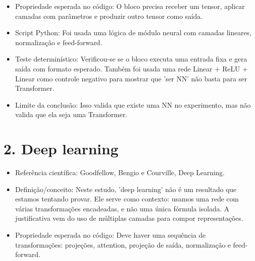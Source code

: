 \begin{itemize}
\item Propriedade esperada no código:
O bloco precisa receber um tensor, aplicar camadas com parâmetros e produzir
outro tensor como saída.
\end{itemize}

\begin{itemize}
\item Script Python:
Foi usada uma lógica de módulo neural com camadas lineares, normalização e
feed-forward.
\end{itemize}

\begin{itemize}
\item Teste determinístico:
Verificou-se se o bloco executa uma entrada fixa e gera saída com formato
esperado. Também foi usada uma rede Linear + ReLU + Linear como controle
negativo para mostrar que 'ser NN' não basta para ser Transformer.
\end{itemize}

\begin{itemize}
\item Limite da conclusão:
Isso valida que existe uma NN no experimento, mas não valida que ela seja uma
Transformer.
\end{itemize}



\section{2. Deep learning}


\begin{itemize}
\item Referência científica:
Goodfellow, Bengio e Courville, Deep Learning.
\end{itemize}

\begin{itemize}
\item Definição/conceito:
Neste estudo, 'deep learning' não é um resultado que estamos tentando provar.
Ele serve como contexto: usamos uma rede com várias transformações encadeadas,
e não uma única fórmula isolada. A justificativa vem do uso de múltiplas
camadas para compor representações.
\end{itemize}

\begin{itemize}
\item Propriedade esperada no código:
Deve haver uma sequência de transformações: projeções, attention, projeção de
saída, normalização e feed-forward.
\end{itemize}

